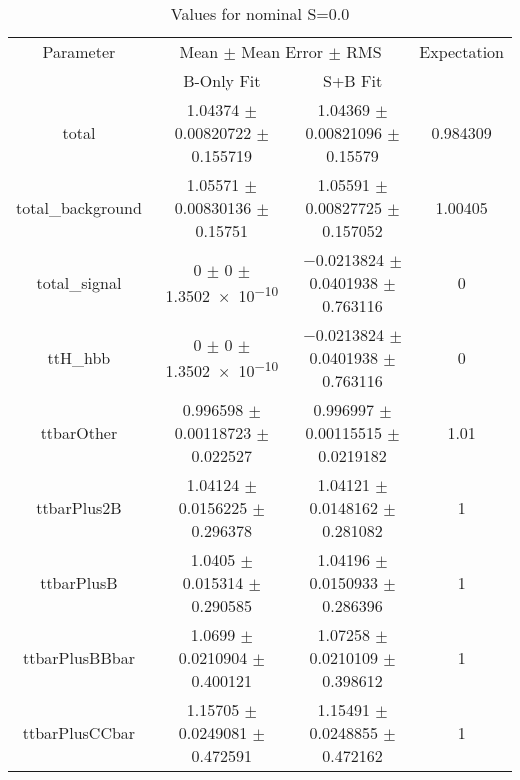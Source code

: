 \begin{table}
\centering
\caption{Values for nominal S=0.0}
\begin{tabular}{cccc}
\toprule
Parameter & \multicolumn{2}{c}{Mean $\pm$ Mean Error $\pm$ RMS} & Expectation\\
 & B-Only Fit & S+B Fit & \\
\midrule
total & \num{1.04374} $\pm$ \num{0.00820722} $\pm$ \num{0.155719} & \num{1.04369} $\pm$ \num{0.00821096} $\pm$ \num{0.15579} & \num{0.984309}\\
total\_background & \num{1.05571} $\pm$ \num{0.00830136} $\pm$ \num{0.15751} & \num{1.05591} $\pm$ \num{0.00827725} $\pm$ \num{0.157052} & \num{1.00405}\\
total\_signal & \num{0} $\pm$ \num{0} $\pm$ \num{1.3502e-10} & \num{-0.0213824} $\pm$ \num{0.0401938} $\pm$ \num{0.763116} & \num{0}\\
ttH\_hbb & \num{0} $\pm$ \num{0} $\pm$ \num{1.3502e-10} & \num{-0.0213824} $\pm$ \num{0.0401938} $\pm$ \num{0.763116} & \num{0}\\
ttbarOther & \num{0.996598} $\pm$ \num{0.00118723} $\pm$ \num{0.022527} & \num{0.996997} $\pm$ \num{0.00115515} $\pm$ \num{0.0219182} & \num{1.01}\\
ttbarPlus2B & \num{1.04124} $\pm$ \num{0.0156225} $\pm$ \num{0.296378} & \num{1.04121} $\pm$ \num{0.0148162} $\pm$ \num{0.281082} & \num{1}\\
ttbarPlusB & \num{1.0405} $\pm$ \num{0.015314} $\pm$ \num{0.290585} & \num{1.04196} $\pm$ \num{0.0150933} $\pm$ \num{0.286396} & \num{1}\\
ttbarPlusBBbar & \num{1.0699} $\pm$ \num{0.0210904} $\pm$ \num{0.400121} & \num{1.07258} $\pm$ \num{0.0210109} $\pm$ \num{0.398612} & \num{1}\\
ttbarPlusCCbar & \num{1.15705} $\pm$ \num{0.0249081} $\pm$ \num{0.472591} & \num{1.15491} $\pm$ \num{0.0248855} $\pm$ \num{0.472162} & \num{1}\\
\bottomrule
\end{tabular}
\end{table}